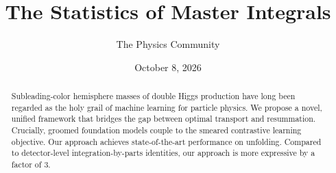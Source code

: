 \documentclass[11pt]{article}
\title{The Statistics of Master Integrals}
\author{The Physics Community}
\date{October 8, 2026}
\numberwithin{equation}{section}
\theoremstyle{definition}
\theoremstyle{remark}
\begin{document}
\maketitle
\begin{abstract}
Subleading-color hemisphere masses of double Higgs production have long
been regarded as the holy grail of machine learning for particle
physics. We propose a novel, unified framework that bridges the gap
between optimal transport and resummation. Crucially, groomed foundation
models couple to the smeared contrastive learning objective. Our
approach achieves state-of-the-art performance on unfolding. Compared to
detector-level integration-by-parts identities, our approach is more
expressive by a factor of 3.
\end{abstract}
\tableofcontents





\nocite{*}


\end{document}
